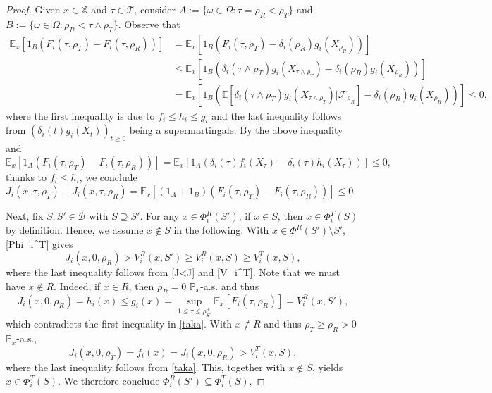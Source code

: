 \documentclass[11pt,reqno]{article}
\numberwithin{equation}{section}
\newtheorem{lemma}{Lemma}[section]
\renewcommand{\P}{\mathbb{P}}
\newcommand{\E}{\mathbb{E}}
\newcommand{\X}{\mathbb{X}}
\newcommand{\B}{\mathcal{B}}
\begin{document}
\begin{proof}
Given $x\in\X$ and $\tau\in\mathcal{T}$, consider $A:=\{\omega\in\Omega:\tau=\rho_R<\rho_T\}$ and $B:=\{\omega\in\Omega:\rho_R<\tau\wedge\rho_T\}.$
Observe that
\begin{align*}
\E_x\left[1_B(F_i(\tau,\rho_T)-F_i(\tau,\rho_R))\right]&=\E_x\left[1_B(F_i(\tau,\rho_T)-\delta_i(\rho_R)g_i(X_{\rho_R}))\right]\\
&\leq\E_x\left[1_B(\delta_i(\tau\wedge\rho_T)g_i(X_{\tau\wedge\rho_T})-\delta_i(\rho_R)g_i(X_{\rho_R}))\right]\\
&=\E_x\left[1_B\left(\E\left[\delta_i(\tau\wedge\rho_T)g_i(X_{\tau\wedge\rho_T})\Big|\mathcal{F}_{\rho_R}\right]-\delta_i(\rho_R)g_i(X_{\rho_R})\right)\right]\leq 0,
\end{align*}
where the first inequality is due to $f_i\leq h_i\leq g_i$ and the last inequality follows from $(\delta_i(t)g_i(X_t))_{t\geq 0}$ being a supermartingale. By the above inequality and %
\[
\E_x\left[1_A(F_i(\tau,\rho_T)-F_i(\tau,\rho_R))\right]=\E_x\left[1_A(\delta_i(\tau)f_i(X_\tau)-\delta_i(\tau)h_i(X_\tau))\right]\leq 0,
\]
thanks to $f_i\le h_i$, we conclude $J_i(x,\tau,\rho_T)-J_i(x,\tau,\rho_R)=\E_x\left[(1_A+1_B)(F_i(\tau,\rho_T)-F_i(\tau,\rho_R))\right]\le 0$.

Next, fix $S, S'\in\B$ with $S\supseteq S'$. For any $x\in \Phi_i^R(S')$, if $x\in S$, then $x\in \Phi_i^T(S)$ by definition. Hence, we assume $x\notin S$ in the following. With $x\in \Phi^R(S')\setminus S'$, \eqref{Phi_i^T} gives
\begin{equation}\label{taka}
J_i(x,0,\rho_R)>V_i^R(x,S')\geq V_i^R(x,S)\geq V_i^T(x,S),
\end{equation}
where the last inequality follows from \eqref{J<J} and \eqref{V_i^T}. Note that we must have $x\notin R$. Indeed, if $x\in R$, then $\rho_R=0$ $\P_x$-a.s. and thus 
\[
J_i(x,0,\rho_R)=h_i(x)\le g_i(x) =\sup_{1\le \tau\le \rho^+_{S'}} \E_x[F_i(\tau,\rho_R)] =V_i^R(x,S'),
\]
which contradicts the first inequality in \eqref{taka}. With $x\notin R$ and thus $\rho_T\ge \rho_R>0$ $\P_x$-a.s., 
$$J_i(x,0,\rho_T) = f_i(x)= J_i(x,0,\rho_R)>V_i^T(x,S),$$
where the last inequality follows from \eqref{taka}. This, together with $x\notin S$, yields $x\in \Phi_i^T(S)$. We therefore conclude $\Phi_i^R(S')\subseteq\Phi_i^T(S)$.
\end{proof}

\end{document}
